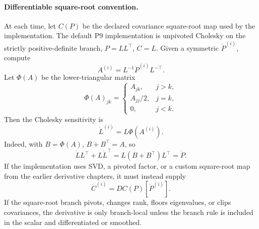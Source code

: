 \paragraph{Differentiable square-root convention.}
At each time, let \(C(P)\) be the declared covariance square-root map used by
the implementation.  The default P9 implementation is unpivoted Cholesky on the
strictly positive-definite branch, \(P=LL^\top\), \(C=L\).  Given a symmetric
\(\dot P^{(i)}\), compute
\[
  A^{(i)}=L^{-1}\dot P^{(i)}L^{-\top}.
\]
Let \(\Phi(A)\) be the lower-triangular matrix
\[
  \Phi(A)_{jk}=
  \begin{cases}
    A_{jk}, & j>k,\\
    A_{jj}/2, & j=k,\\
    0, & j<k .
  \end{cases}
\]
Then the Cholesky sensitivity is
\begin{equation}
  \dot L^{(i)}=L\Phi(A^{(i)}).
  \label{eq:bf-hd-fsgq-cholesky-derivative}
\end{equation}
Indeed, with \(B=\Phi(A)\), \(B+B^\top=A\), so
\[
  \dot L L^\top+L\dot L^\top
  =
  L(B+B^\top)L^\top
  =
  \dot P .
\]
If the implementation uses SVD, a pivoted factor, or a custom square-root map
from the earlier derivative chapters, it must instead supply
\[
  \dot C^{(i)} = D C(P)[\dot P^{(i)}].
\]
If the square-root branch pivots, changes rank, floors eigenvalues, or clips
covariances, the derivative is only branch-local unless the branch rule is
included in the scalar and differentiated or smoothed.

